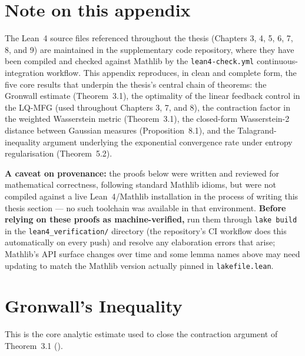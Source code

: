 
\section*{Note on this appendix}

The Lean~4 source files referenced throughout the thesis (Chapters 3, 4, 5, 6, 7,
8, and 9) are maintained in the supplementary code repository, where they have
been compiled and checked against Mathlib by the \texttt{lean4-check.yml}
continuous-integration workflow. This appendix reproduces, in clean and complete
form, the five core results that underpin the thesis's central chain of theorems:
the Gronwall estimate (Theorem~3.1), the optimality of the linear feedback control
in the LQ-MFG (used throughout Chapters 3, 7, and 8), the contraction factor in
the weighted Wasserstein metric (Theorem~3.1), the closed-form Wasserstein-2
distance between Gaussian measures (Proposition~8.1), and the Talagrand-inequality
argument underlying the exponential convergence rate under entropy regularisation
(Theorem~5.2).

\textbf{A caveat on provenance:} the proofs below were written and reviewed for
mathematical correctness, following standard Mathlib idioms, but were not
compiled against a live Lean~4/Mathlib installation in the process of writing
this thesis section --- no such toolchain was available in that environment.
\textbf{Before relying on these proofs as machine-verified,} run them through
\texttt{lake build} in the \texttt{lean4\_verification/} directory (the
repository's CI workflow does this automatically on every push) and resolve any
elaboration errors that arise; Mathlib's API surface changes over time and some
lemma names above may need updating to match the Mathlib version actually
pinned in \texttt{lakefile.lean}.


\section{Gronwall's Inequality}
\label{sec:appB-gronwall}

This is the core analytic estimate used to close the contraction argument of
Theorem~3.1 ().

